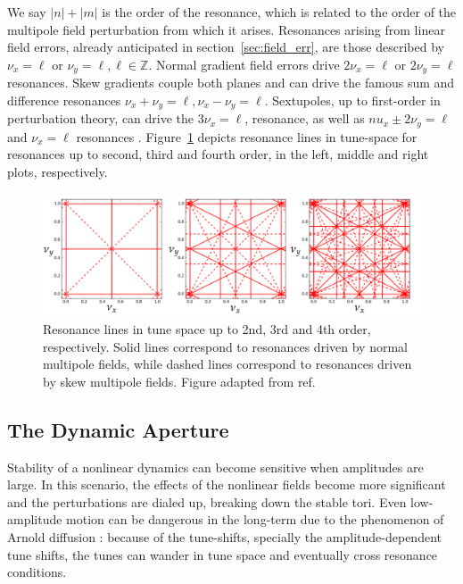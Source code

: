     We say $|n|+|m|$ is the order of the resonance, which is related to the order of the multipole field perturbation from which it arises.
    Resonances arising from linear field errors, already anticipated in section~\ref{sec:field_err}, are those described by $\nu_x=\ell$ or $\nu_y =\ell, \ell\in\mathbb{Z}$. Normal gradient field errors drive $2\nu_x=\ell$ or $2\nu_y =\ell$ resonances. Skew gradients couple both planes and can drive the famous sum and difference resonances $\nu_x + \nu_y = \ell, \nu_x - \nu_y = \ell$. Sextupoles, up to first-order in perturbation theory, can drive the $3\nu_x=\ell$, resonance, as well as $nu_x \pm 2\nu_y = \ell$ and $\nu_x =\ell$ resonances \cite[section 11.2.4]{wolski_beam_2014}. Figure~\ref{fig:resons} depicts resonance lines in tune-space for resonances up to second, third and fourth order, in the left, middle and right plots, respectively.
\begin{figure}[thb]
    \centering
    \includegraphics[width=\textwidth]{Images/tunes.png}
    \caption[Resonance lines in tune space up to 2nd, 3rd and 4th order.]{Resonance lines in tune space up to 2nd, 3rd and 4th order, respectively. Solid lines correspond to resonances driven by normal multipole fields, while dashed lines correspond to resonances driven by skew multipole fields. Figure adapted from ref.~\cite{bartosik_first2022}}
    \label{fig:resons}
\end{figure}
\subsection{The Dynamic Aperture}
    Stability of a nonlinear dynamics can become sensitive when amplitudes are large. In this scenario, the effects of the nonlinear fields become more significant and the perturbations are dialed up, breaking down the stable tori. Even low-amplitude motion can be dangerous in the long-term due to the phenomenon of Arnold diffusion \cite{wolski_beam_2014, arnold_instability1964}: because of the tune-shifts, specially the amplitude-dependent tune shifts, the tunes can wander in tune space and eventually cross resonance conditions.

